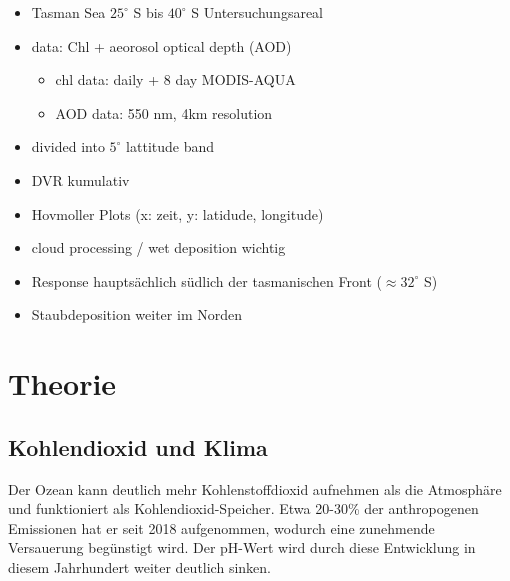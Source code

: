 \documentclass[12pt,a4paper,onecolumn]{scrartcl}
\begin{document}
\begin{itemize}
\item Tasman Sea $25^\circ$ S bis $40^\circ$ S Untersuchungsareal
\item data: Chl + aeorosol optical depth (AOD)
\begin{itemize}
\item chl data: daily + 8 day MODIS-AQUA
\item AOD data: 550 nm, 4km resolution 
\end{itemize}
\item divided into $5^\circ$ lattitude band
\item DVR kumulativ
\item Hovmoller Plots (x: zeit, y: latidude, longitude)
\item cloud processing / wet deposition wichtig
\item Response hauptsächlich südlich der tasmanischen Front ($\approx 32^\circ$ S) 
\item Staubdeposition weiter im Norden

\end{itemize}

\section{Theorie}
\subsection{Kohlendioxid und Klima}
Der Ozean kann deutlich mehr Kohlenstoffdioxid aufnehmen als die Atmosphäre \citep{Martin.1990} und funktioniert als Kohlendioxid-Speicher. Etwa 20-30\% der anthropogenen Emissionen \citep{Portner.2019} hat er seit 2018 aufgenommen, wodurch eine zunehmende Versauerung begünstigt wird. Der pH-Wert wird durch diese Entwicklung in diesem Jahrhundert weiter deutlich sinken. 
\end{document}
